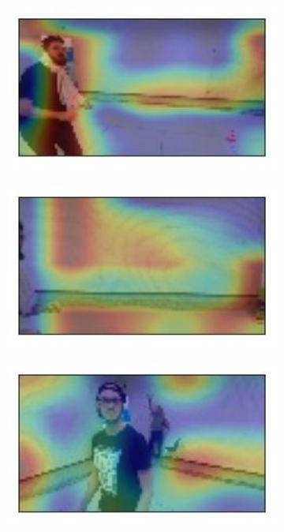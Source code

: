 \begin{figure}[!h]
	\begin{center}
		\begin{subfigure}[h]{0.24\textwidth}
			\centering
			\includegraphics[width=1\textwidth]{"contents/images/gradcam/gradcam-random-1"}
		\end{subfigure}
		\hfill
		\begin{subfigure}[h]{0.24\textwidth}
			\centering
			\includegraphics[width=1\textwidth]{"contents/images/gradcam/gradcam-random-2"}
		\end{subfigure}
		\hfill
		\begin{subfigure}[h]{0.24\textwidth}
			\centering
			\includegraphics[width=1\textwidth]{"contents/images/gradcam/gradcam-random-3"}

\end{subfigure}
\end{center}
\end{figure}
